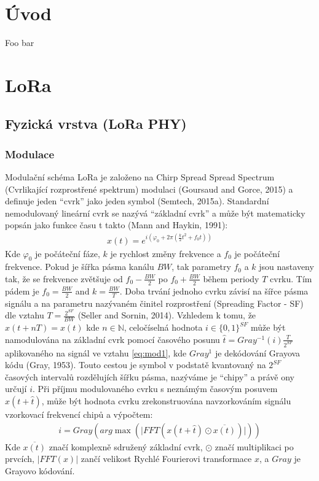 \documentclass{ctuthesis}
\begin{document}
\maketitle

\chapter{Úvod}

Foo bar

\chapter{LoRa}
\section{Fyzická vrstva (LoRa PHY)}
\subsection{Modulace}
Modulační schéma LoRa je založeno na Chirp Spread Spread Spectrum (Cvrlikající rozprostřené spektrum) modulaci  (Goursaud and Gorce, 2015) a definuje jeden “cvrk” jako jeden symbol  (Semtech, 2015a). Standardní nemodulovaný lineární cvrk se nazývá “základní cvrk” a může být matematicky popsán jako funkce času t takto (Mann and Haykin, 1991):
\begin{align}x(t)=e^{i(\varphi_{0}+2\pi(\frac{k}{2}t^{2} + f_{0}t))}
\label{eq:lora1}
\end{align}
Kde  $\varphi_{0}$ je počáteční fáze, $k$ je rychlost změny frekvence a $f_{0}$ je počáteční frekvence. Pokud je šířka pásma kanálu $BW$, tak parametry $f_{0}$ a $k$ jsou nastaveny tak, že se frekvence zvětšuje od $f_{0}-\frac{BW}{2}$ po $f_{0}+\frac{BW}{2}$ během periody $T$ cvrku. Tím pádem je $f_{0}=\frac{BW}{2}$ and $k = \frac{BW}{T}$. Doba trvání jednoho cvrku závisí na šířce pásma signálu a na parametru nazývaném činitel rozprostření (Spreading Factor - SF) dle vztahu $T = \frac{2^{SF}}{BW}$ (Seller and Sornin, 2014).
Vzhledem k tomu, že $x(t + nT) = x(t)$ kde $n\in \mathbb{N}$, celočíselná hodnota $i \in \{0, 1\}^{SF}$ může být namodulována na základní cvrk pomocí časového posunu $\hat{t} = Gray^{-1}(i)\frac{T}{2^{SF}}$ aplikovaného na signál ve vztahu \eqref{eq:mod1},  kde $Gray^{1}$ je dekódování Grayova kódu (Gray, 1953). Touto cestou je symbol v podstatě kvantovaný na $2^{SF}$ časových intervalů rozdělujích šířku pásma, nazýváme je “chipy” a právě ony určují $i$. Při příjmu modulovaného cvrku s neznámým časovým posuvem $x(t + \hat{t})$, může být hodnota cvrku zrekonstruována navzorkováním signálu vzorkovací frekvencí chipů a výpočtem:
\begin{align}i= Gray(arg \max (\lvert FFT(x(t+ \hat{t}) \odot \overline{x(t)}) \rvert ))
\label{eq:lora2}
\end{align}
Kde $\overline{x(t)}$ značí komplexně sdružený základní cvrk, $\odot$ značí multiplikaci po prvcích, $\lvert FFT(x) \rvert$ zančí velikost Rychlé Fourierovi transformace $x$, a $Gray$ je Grayovo kódování. 
\end{document}
